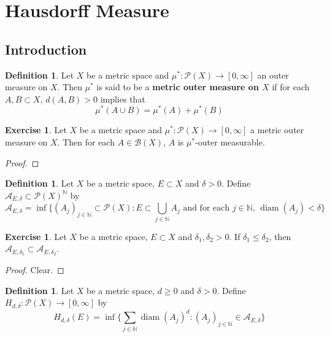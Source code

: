 \documentclass[12pt]{amsart}
\theoremstyle{definition}
\newtheorem{defn}[definition]{Definition}
\newtheorem{ex}[definition]{Exercise}
\newcommand{\del}{\delta}
\newcommand{\N}{\mathbb{N}}
\newcommand{\MA}{\mathcal{A}}
\newcommand{\MB}{\mathcal{B}}
\newcommand{\MP}{\mathcal{P}}
\DeclareMathOperator{\diam}{diam}
\begin{document}
	
	
	
	
	
	\newpage
	\section{Hausdorff Measure}
	
	\subsection{Introduction}
	
	\begin{defn}
	Let $X$ be a metric space and $\mu^*: \MP(X) \rightarrow [0, \infty]$ an outer measure on $X$. Then $\mu^*$ is said to be a \textbf{metric outer measure on $X$} if for each $A, B \subset X$, $d(A,B) > 0$ implies that 
	\begin{equation*}
	\mu^*(A \cup B) = \mu^*(A) + \mu^*(B)
	\end{equation*}
	\end{defn}	
	
	\begin{ex}
	Let $X$ be a metric space and $\mu^*: \MP(X) \rightarrow [0, \infty]$ a metric outer measure on $X$.
	Then for each $A \in \MB(X)$, $A$ is $\mu^*$-outer measurable. 
	\end{ex}
	
	\begin{proof}
	
	\end{proof}
	
	
	\begin{defn}
	Let $X$ be a metric space, $E \subset X$ and $\del >0$. Define $\MA_{E, \del} \subset \MP(X)^{\N}$ by 
	\begin{equation*}
	 \MA_{E, \del} = \inf \bigg \{(A_j)_{j \in \N} \subset \MP(X): E \subset \bigcup\limits_{j \in \N}A_j \text{ and for each $j \in \N$, } \diam(A_j) < \del \bigg \}
	\end{equation*}
	\end{defn}
	
	\begin{ex}
	Let $X$ be a metric space, $E \subset X$ and $\del_1, \del_2 >0$. If $\del_1 \leq \del_2$, then $\MA_{E, \del_1} \subset \MA_{E, \del_2}$.
	\end{ex}
	
	\begin{proof}
	Clear.
	\end{proof}
	
	\begin{defn}
	Let $X$ be a metric space, $d \geq 0$ and $\del >0$. Define $H_{d, \del}: \MP(X) \rightarrow [0, \infty]$ by 
	\begin{equation*}
	H_{d, \del}(E) = \inf \bigg \{\sum_{j \in \N} \diam(A_j)^d: (A_j)_{j \in \N} \in \MA_{E, \del} \bigg \}
	\end{equation*}
	\end{defn}
	
\end{document}
